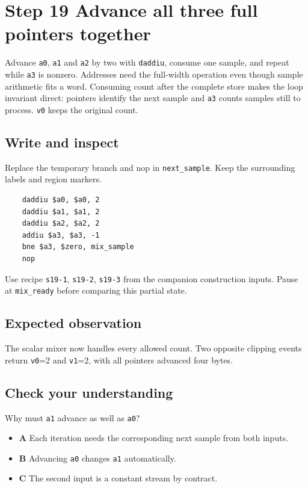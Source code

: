 \section{Step 19 Advance all three full pointers together}\label{pcm-s19}

Advance \texttt{a0}, \texttt{a1} and \texttt{a2} by two with \texttt{daddiu}, consume one sample, and repeat while \texttt{a3} is nonzero. Addresses need the full-width operation even though sample arithmetic fits a word. Consuming count after the complete store makes the loop invariant direct: pointers identify the next sample and \texttt{a3} counts samples still to process. \texttt{v0} keeps the original count.

\subsection{Write and inspect}
Replace the temporary branch and nop in \texttt{next\_sample}. Keep the surrounding labels and region markers.

\begin{verbatim}
    daddiu $a0, $a0, 2
    daddiu $a1, $a1, 2
    daddiu $a2, $a2, 2
    addiu $a3, $a3, -1
    bne $a3, $zero, mix_sample
    nop
\end{verbatim}
Use recipe \texttt{s19-1}, \texttt{s19-2}, \texttt{s19-3} from the companion construction inputs. Pause at \texttt{mix\_ready} before comparing this partial state.

\subsection{Expected observation}
The scalar mixer now handles every allowed count. Two opposite clipping events return \texttt{v0}=2 and \texttt{v1}=2, with all pointers advanced four bytes.

\subsection{Check your understanding}
Why must \texttt{a1} advance as well as \texttt{a0}?

\begin{itemize}
\item \textbf{A} Each iteration needs the corresponding next sample from both inputs.
\item \textbf{B} Advancing \texttt{a0} changes \texttt{a1} automatically.
\item \textbf{C} The second input is a constant stream by contract.
\end{itemize}
